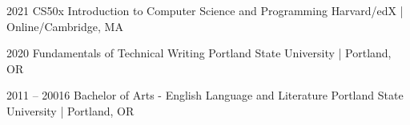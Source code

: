 \documentclass[9pt]{developercv} %
\begin{document}
\begin{entrylist}
	\entry
		{2021}
		{CS50x Introduction to Computer Science and Programming}
		{Harvard/edX | Online/Cambridge, MA}
		
	\entry
		{2020}
		{Fundamentals of Technical Writing}
		{Portland State University | Portland, OR}

	\entry
		{2011 -- 20016}
		{Bachelor of Arts - English Language and Literature}
		{Portland State University | Portland, OR}

\end{entrylist}

\end{document}
